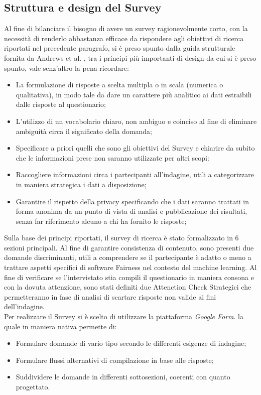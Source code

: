     \subsection{Struttura e design del Survey}
    Al fine di bilanciare il bisogno di avere un survey ragionevolmente corto, con la necessità di renderlo abbastanza efficace da rispondere agli obiettivi di ricerca riportati nel precedente paragrafo, si è preso spunto dalla guida strutturale fornita da Andrews et al. \cite{andrews2007conducting}, tra i principi più importanti di design da cui si è preso spunto, vale senz'altro la pena ricordare:
    
    \begin{itemize}
        \item La formulazione di risposte a scelta multipla o in scala (numerica o qualitativa), in modo tale da dare un carattere più analitico ai dati estraibili dalle risposte al questionario;
        \item L'utilizzo di un vocabolario chiaro, non ambiguo e coinciso al fine di eliminare ambiguità circa il significato della domanda;
        \item Specificare a priori quelli che sono gli obiettivi del Survey e chiarire da subito che le informazioni prese non saranno utilizzate per altri scopi:
        \item Raccogliere informazioni circa i partecipanti all'indagine, utili a categorizzare in maniera strategica i dati a disposizione;
        \item Garantire il rispetto della privacy specificando che i dati saranno trattati in forma anonima da un punto di vista di analisi e pubblicazione dei risultati, senza far riferimento alcuno a chi ha fornito le risposte;
    \end{itemize}
    
    Sulla base dei principi riportati, il survey di ricerca è stato formalizzato in 6 sezioni principali. Al fine di garantire consistenza di contenuto, sono presenti due domande discriminanti, utili a comprendere se il partecipante è adatto o meno a trattare aspetti specifici di software Fairness nel contesto del machine learning. Al fine di verificare se l'intervistato stia compili il questionario in maniera consona e con la dovuta attenzione, sono stati definiti due Attenction Check Strategici che permetteranno in fase di analisi di scartare risposte non valide ai fini dell'indagine.\\ 
    
    Per realizzare il Survey si è scelto di utilizzare la piattaforma \emph{Google Form}. la quale in maniera nativa permette di:
    \
    \begin{itemize}
        \item Formulare domande di vario tipo secondo le differenti esigenze di indagine;
        \item Formulare flussi alternativi di compilazione in base alle risposte;
        \item Suddividere le domande in differenti sottosezioni, coerenti con quanto progettato.
    \end{itemize}
    
